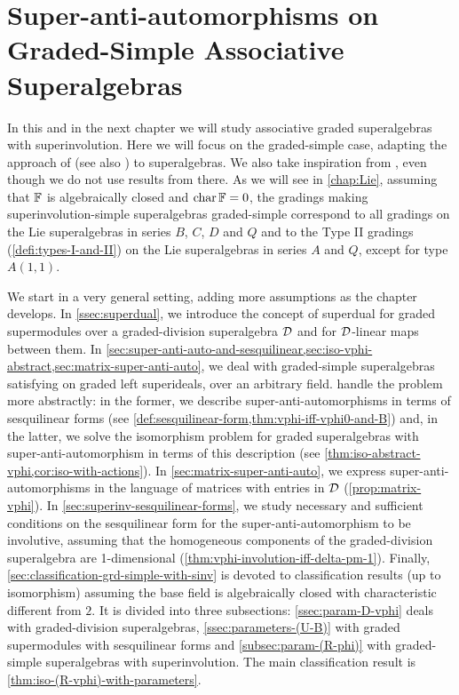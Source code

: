 \chapter{Super-anti-automorphisms on Graded-Simple Associative Superalgebras}\label{chap:super-inv}


In this and in the next chapter we will study associative graded superalgebras with superinvolution. 
Here we will focus on the graded-simple case, adapting the approach of \cite{Eld10} (see also \cite[Section 2.4]{livromicha}) to superalgebras. 
We also take inspiration from \cite{paper-adrian}, even though we do not use results from there. 
As we will see in \cref{chap:Lie}, assuming that $\mathbb{F}$ is algebraically closed and $\operatorname{char} \mathbb{F} = 0$, the gradings making superinvolution-simple superalgebras graded-simple correspond to all gradings on the Lie superalgebras in series $B$, $C$, $D$ and $Q$ and to the Type II gradings (\cref{defi:types-I-and-II}) on the Lie superalgebras in series $A$ and $Q$, except for type $A(1,1)$. 

We start in a very general setting, adding more assumptions as the chapter develops. 
In \cref{ssec:superdual}, we introduce the concept of superdual for graded supermodules over a graded-division superalgebra $\mathcal{D}$ and for $\mathcal{D}$-linear maps between them. 
In \cref{sec:super-anti-auto-and-sesquilinear,sec:iso-vphi-abstract,sec:matrix-super-anti-auto}, we deal with graded-simple superalgebras satisfying \dcc on graded left superideals, over an arbitrary field. 
 handle the problem more abstractly: in the former, we describe super-anti-automorphisms in terms of sesquilinear forms (see \cref{def:sesquilinear-form,thm:vphi-iff-vphi0-and-B}) and, in the latter,
we solve the isomorphism problem for graded superalgebras with super-anti-automorphism in terms of this description (see \cref{thm:iso-abstract-vphi,cor:iso-with-actions}). 
In \cref{sec:matrix-super-anti-auto}, we express super-anti-automorphisms in the language of matrices with entries in $\mathcal{D}$ (\cref{prop:matrix-vphi}). 
In \cref{sec:superinv-sesquilinear-forms}, we study necessary and sufficient conditions on the sesquilinear form for the super-anti-automorphism to be involutive, assuming that the homogeneous components of the graded-division superalgebra are 1-dimensional (\cref{thm:vphi-involution-iff-delta-pm-1}). 
Finally, \cref{sec:classification-grd-simple-with-sinv} is devoted to classification results (up to isomorphism) assuming the base field is algebraically closed with characteristic different from $2$. 
It is divided into three subsections: \cref{ssec:param-D-vphi} deals with graded-division superalgebras, \cref{ssec:parameters-(U-B)} with graded supermodules with sesquilinear forms and \cref{subsec:param-(R-phi)} with graded-simple superalgebras with superinvolution. 
The main classification result is \cref{thm:iso-(R-vphi)-with-parameters}. 

